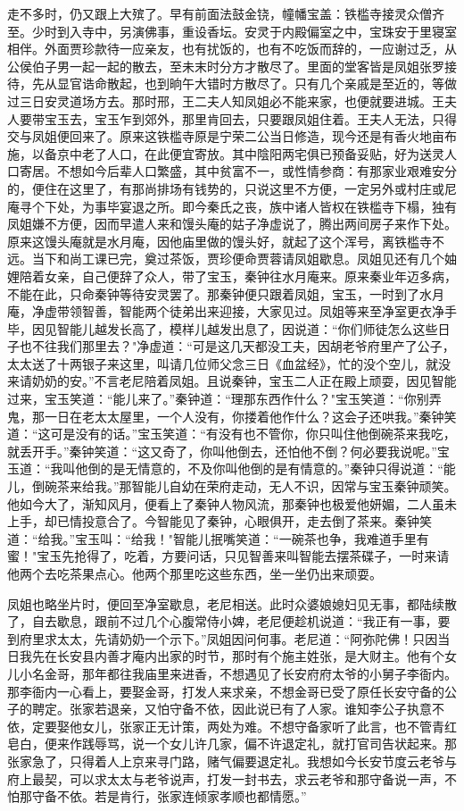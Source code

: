 走不多时，仍又跟上大殡了。早有前面法鼓金铙，幢幡宝盖：铁槛寺接灵众僧齐至。少时到入寺中，另演佛事，重设香坛。安灵于内殿偏室之中，宝珠安于里寝室相伴。外面贾珍款待一应亲友，也有扰饭的，也有不吃饭而辞的，一应谢过乏，从公侯伯子男一起一起的散去，至未末时分方才散尽了。里面的堂客皆是凤姐张罗接待，先从显官诰命散起，也到晌午大错时方散尽了。只有几个亲戚是至近的，等做过三日安灵道场方去。那时邢，王二夫人知凤姐必不能来家，也便就要进城。王夫人要带宝玉去，宝玉乍到郊外，那里肯回去，只要跟凤姐住着。王夫人无法，只得交与凤姐便回来了。原来这铁槛寺原是宁荣二公当日修造，现今还是有香火地亩布施，以备京中老了人口，在此便宜寄放。其中陰阳两宅俱已预备妥贴，好为送灵人口寄居。不想如今后辈人口繁盛，其中贫富不一，或性情参商：有那家业艰难安分的，便住在这里了，有那尚排场有钱势的，只说这里不方便，一定另外或村庄或尼庵寻个下处，为事毕宴退之所。即今秦氏之丧，族中诸人皆权在铁槛寺下榻，独有凤姐嫌不方便，因而早遣人来和馒头庵的姑子净虚说了，腾出两间房子来作下处。原来这馒头庵就是水月庵，因他庙里做的馒头好，就起了这个浑号，离铁槛寺不远。当下和尚工课已完，奠过茶饭，贾珍便命贾蓉请凤姐歇息。凤姐见还有几个妯娌陪着女亲，自己便辞了众人，带了宝玉，秦钟往水月庵来。原来秦业年迈多病，不能在此，只命秦钟等待安灵罢了。那秦钟便只跟着凤姐，宝玉，一时到了水月庵，净虚带领智善，智能两个徒弟出来迎接，大家见过。凤姐等来至净室更衣净手毕，因见智能儿越发长高了，模样儿越发出息了，因说道：“你们师徒怎么这些日子也不往我们那里去？"净虚道：“可是这几天都没工夫，因胡老爷府里产了公子，太太送了十两银子来这里，叫请几位师父念三日《血盆经》，忙的没个空儿，就没来请奶奶的安。”不言老尼陪着凤姐。且说秦钟，宝玉二人正在殿上顽耍，因见智能过来，宝玉笑道：“能儿来了。”秦钟道：“理那东西作什么？"宝玉笑道：“你别弄鬼，那一日在老太太屋里，一个人没有，你搂着他作什么？这会子还哄我。”秦钟笑道：“这可是没有的话。”宝玉笑道：“有没有也不管你，你只叫住他倒碗茶来我吃，就丢开手。”秦钟笑道：“这又奇了，你叫他倒去，还怕他不倒？何必要我说呢。”宝玉道：“我叫他倒的是无情意的，不及你叫他倒的是有情意的。”秦钟只得说道：“能儿，倒碗茶来给我。”那智能儿自幼在荣府走动，无人不识，因常与宝玉秦钟顽笑。他如今大了，渐知风月，便看上了秦钟人物风流，那秦钟也极爱他妍媚，二人虽未上手，却已情投意合了。今智能见了秦钟，心眼俱开，走去倒了茶来。秦钟笑道：“给我。”宝玉叫：“给我！"智能儿抿嘴笑道：“一碗茶也争，我难道手里有蜜！"宝玉先抢得了，吃着，方要问话，只见智善来叫智能去摆茶碟子，一时来请他两个去吃茶果点心。他两个那里吃这些东西，坐一坐仍出来顽耍。

凤姐也略坐片时，便回至净室歇息，老尼相送。此时众婆娘媳妇见无事，都陆续散了，自去歇息，跟前不过几个心腹常侍小婢，老尼便趁机说道：“我正有一事，要到府里求太太，先请奶奶一个示下。”凤姐因问何事。老尼道：“阿弥陀佛！只因当日我先在长安县内善才庵内出家的时节，那时有个施主姓张，是大财主。他有个女儿小名金哥，那年都往我庙里来进香，不想遇见了长安府府太爷的小舅子李衙内。那李衙内一心看上，要娶金哥，打发人来求亲，不想金哥已受了原任长安守备的公子的聘定。张家若退亲，又怕守备不依，因此说已有了人家。谁知李公子执意不依，定要娶他女儿，张家正无计策，两处为难。不想守备家听了此言，也不管青红皂白，便来作践辱骂，说一个女儿许几家，偏不许退定礼，就打官司告状起来。那张家急了，只得着人上京来寻门路，赌气偏要退定礼。我想如今长安节度云老爷与府上最契，可以求太太与老爷说声，打发一封书去，求云老爷和那守备说一声，不怕那守备不依。若是肯行，张家连倾家孝顺也都情愿。”

